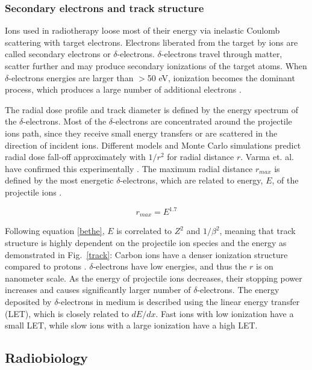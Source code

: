 \subsubsection{Secondary electrons and track structure}

Ions used in radiotherapy loose most of their energy via inelastic Coulomb scattering with target electrons. Electrons liberated from the target by ions are called secondary electrons or $\delta$-electrons. 
$\delta$-electrons travel through matter, scatter further and may produce secondary ionizations of the target atoms. When $\delta$-electrons energies are larger than $>$50 eV,
ionization becomes the dominant process, which produces a large number of additional electrons \cite{Kraft2000,Schardt2010}.

The radial dose profile and track diameter is defined by the energy spectrum of the $\delta$-electrons. Most of the $\delta$-electrons are concentrated around the projectile ions path, since they receive small energy transfers 
or are scattered in the direction of incident ions. Different models \cite{Chatterjee1976,Katz1999} and Monte Carlo simulations \cite{Paretzke1986,Kraemer1995} predict radial dose fall-off approximately with $1/r^2$ for radial distance $r$. Varma et. al. have confirmed 
this experimentally \cite{Varma1977}. The maximum radial distance $r_{max}$ is defined by the most energetic $\delta$-electrons, which are related to energy, $E$, of the projectile ions \cite{Kiefer1986}.

\begin{equation}
 r_{max} = E^{1.7}
\end{equation}

Following equation \ref{bethe}, $E$ is correlated to $Z^2$ and $1/\beta^2$, meaning that track structure is highly dependent on the projectile ion species and the energy as demonstrated in Fig.~\ref{track}:
Carbon ions have a denser ionization structure compared to protons \cite{Kraemer2010}. $\delta$-electrons have low energies, and thus the $r$ is on nanometer scale. As the energy of projectile ions decreases, their
stopping power increases and causes significantly larger number of $\delta$-electrons. The energy deposited by $\delta$-electrons in medium is described using the linear energy transfer (LET), which is closely related to 
$dE/dx$. Fast ions with low ionization have a small LET, while slow ions with a large ionization have a high LET.


\subsection{Radiobiology}

